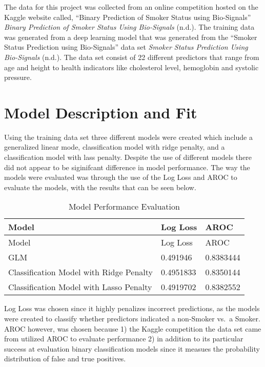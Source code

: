 \documentclass[
  12pt,
  letterpaper,
]{article}
\begin{document}
The data for this project was collected from an online competition
hosted on the Kaggle website called, ``Binary Prediction of Smoker
Status using Bio-Signals'' \emph{Binary {Prediction} of {Smoker}
{Status} Using {Bio}-{Signals}} (n.d.). The training data was generated
from a deep learning model that was generated from the ``Smoker Status
Prediction using Bio-Signals'' data set \emph{Smoker {Status}
{Prediction} Using {Bio}-{Signals}} (n.d.). The data set consist of 22
different predictors that range from age and height to health indicators
like cholesterol level, hemoglobin and systolic pressure.

\hypertarget{model-description-and-fit}{%
\section{Model Description and Fit}\label{model-description-and-fit}}

Using the training data set three different models were created which
include a generalized linear mode, classification model with ridge
penalty, and a classification model with lass penalty. Despite the use
of different models there did not appear to be siginifcant difference in
model performance. The way the models were evaluated was through the use
of the Log Loss and AROC to evaluate the models, with the results that
can be seen below.

\begin{longtable}[]{@{}lll@{}}
\caption{Model Performance Evaluation}\tabularnewline
\toprule\noalign{}
Model & Log Loss & AROC \\
\midrule\noalign{}
\endfirsthead
\toprule\noalign{}
Model & Log Loss & AROC \\
\midrule\noalign{}
\endhead
\bottomrule\noalign{}
\endlastfoot
GLM & 0.491946 & 0.8383444 \\
Classification Model with Ridge Penalty & 0.4951833 & 0.8350144 \\
Classification Model with Lasso Penalty & 0.4919702 & 0.8382552 \\
\end{longtable}

Log Loss was chosen since it highly penalizes incorrect predictions, as
the models were created to classify whether predictors indicated a
non-Smoker vs.~a Smoker. AROC however, was chosen because 1) the Kaggle
competition the data set came from utilized AROC to evaluate performance
2) in addition to its particular success at evaluation binary
classification models since it measues the probability distribution of
false and true positives.
\end{document}
